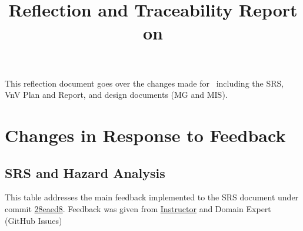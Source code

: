 \documentclass{article}
\title{Reflection and Traceability Report on \progname}
\author{\authname}
\date{}
\begin{document}
\maketitle

This reflection document goes over the changes made for \progname~including the SRS, VnV Plan and Report, and design documents (MG and MIS).

\section{Changes in Response to Feedback}

\subsection{SRS and Hazard Analysis}
This table addresses the main feedback implemented to the SRS document under commit \href{https://github.com/AliyahJimoh/2D-Localizer/blob/28eaed886478711a970bc5f5f34e581087b70cc8/docs/SRS/SRS.pdf}{28eaed8}. Feedback was given from \href{https://github.com/AliyahJimoh/2D-Localizer/issues/2}{Instructor} and Domain Expert (GitHub Issues)
\end{document}
